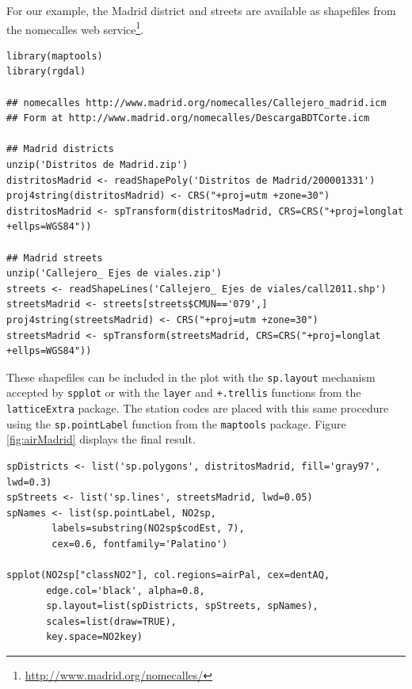 For our example, the Madrid district and streets are available as
shapefiles from the nomecalles web service\footnote{\url{http://www.madrid.org/nomecalles/}}.


\lstset{language=R,numbers=none}
\begin{lstlisting}
library(maptools)
library(rgdal)

## nomecalles http://www.madrid.org/nomecalles/Callejero_madrid.icm
## Form at http://www.madrid.org/nomecalles/DescargaBDTCorte.icm

## Madrid districts
unzip('Distritos de Madrid.zip')
distritosMadrid <- readShapePoly('Distritos de Madrid/200001331')
proj4string(distritosMadrid) <- CRS("+proj=utm +zone=30")
distritosMadrid <- spTransform(distritosMadrid, CRS=CRS("+proj=longlat +ellps=WGS84"))

## Madrid streets
unzip('Callejero_ Ejes de viales.zip')
streets <- readShapeLines('Callejero_ Ejes de viales/call2011.shp')
streetsMadrid <- streets[streets$CMUN=='079',]
proj4string(streetsMadrid) <- CRS("+proj=utm +zone=30")
streetsMadrid <- spTransform(streetsMadrid, CRS=CRS("+proj=longlat +ellps=WGS84"))
\end{lstlisting}

These shapefiles can be included in the plot with the \texttt{sp.layout}
mechanism accepted by \texttt{spplot} or with the \texttt{layer} and \texttt{+.trellis}
functions from the \texttt{latticeExtra} package. The station codes are
placed with this same procedure using the \texttt{sp.pointLabel} function
from the \texttt{maptools} package. Figure \ref{fig:airMadrid} displays the
final result.


\lstset{language=R,numbers=none}
\begin{lstlisting}
spDistricts <- list('sp.polygons', distritosMadrid, fill='gray97', lwd=0.3)
spStreets <- list('sp.lines', streetsMadrid, lwd=0.05)
spNames <- list(sp.pointLabel, NO2sp,
		labels=substring(NO2sp$codEst, 7),
		cex=0.6, fontfamily='Palatino')

spplot(NO2sp["classNO2"], col.regions=airPal, cex=dentAQ,
       edge.col='black', alpha=0.8,
       sp.layout=list(spDistricts, spStreets, spNames),
       scales=list(draw=TRUE),
       key.space=NO2key)
\end{lstlisting}

